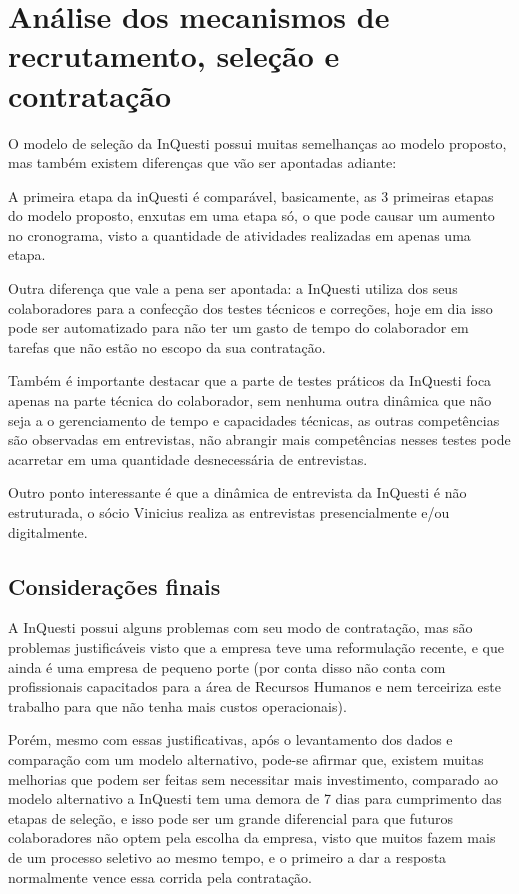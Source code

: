 \chapter{Análise dos mecanismos de recrutamento, seleção e contratação}
O modelo de seleção da InQuesti possui muitas semelhanças ao modelo proposto, mas também existem
 diferenças que vão ser apontadas adiante:

A primeira etapa da inQuesti é comparável, basicamente, as 3 primeiras etapas do modelo proposto, enxutas em uma etapa só, o que pode causar um aumento no cronograma, visto a quantidade de atividades realizadas em apenas uma etapa.

Outra diferença que vale a pena ser apontada: a InQuesti utiliza dos seus colaboradores para a confecção dos testes técnicos e correções, hoje em dia isso pode ser automatizado para não ter um gasto de tempo do colaborador em tarefas que não estão no escopo da sua contratação.

Também é importante destacar que a parte de testes práticos da InQuesti foca apenas na parte técnica 
do colaborador, sem nenhuma outra dinâmica que não seja a o gerenciamento de tempo e capacidades técnicas,
 as outras competências são observadas em entrevistas, não abrangir mais 
competências nesses testes pode acarretar em uma quantidade desnecessária de entrevistas.

Outro ponto interessante é que a dinâmica de entrevista da InQuesti é não estruturada, o sócio Vinicius realiza as entrevistas presencialmente e/ou digitalmente.

\section{Considerações finais}
A InQuesti possui alguns problemas com seu modo de contratação, mas são problemas justificáveis visto que a empresa teve uma reformulação recente, e que ainda é uma empresa de pequeno porte (por conta disso não conta com profissionais capacitados para a área de Recursos Humanos e nem terceiriza este trabalho para que não tenha mais custos operacionais).

Porém, mesmo com essas justificativas, após o levantamento dos dados e comparação com um modelo alternativo, pode-se afirmar que, existem muitas melhorias que podem ser feitas sem necessitar mais investimento, comparado ao modelo alternativo a InQuesti tem uma demora de 7 dias para cumprimento das etapas de seleção, e isso pode ser um grande diferencial para que futuros colaboradores não optem pela escolha da empresa, visto que muitos fazem mais de um processo seletivo ao mesmo tempo, e o primeiro a dar a resposta normalmente vence essa corrida pela contratação.